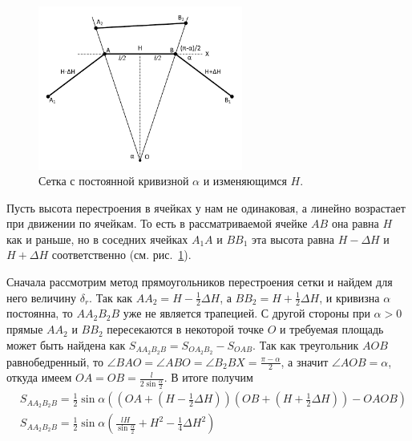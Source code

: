 \begin{figure}[h]
\onelinecaptionstrue
\centering
\includegraphics[width=0.6\textwidth]{pics/text_1_remesh_2d/theoretical_rectangles_2.pdf}
\caption{Сетка с постоянной кривизной $\alpha$ и изменяющимся $H$.}
\label{fig:text_1_remesh_2d_theoretical_rectangles_2}
\end{figure}

Пусть высота перестроения в ячейках у нам не одинаковая, а линейно возрастает при движении по ячейкам.
То есть в рассматриваемой ячейке $AB$ она равна $H$ как и раньше, но в соседних ячейках $A_1A$ и $BB_1$ эта высота равна $H - \Delta H$ и $H + \Delta H$ соответственно (см. рис.~\ref{fig:text_1_remesh_2d_theoretical_rectangles_2}).

Сначала рассмотрим метод прямоугольников перестроения сетки и найдем для него величину $\delta_r$.
Так как $AA_2 = H - \frac{1}{2} \Delta H$, а $BB_2 = H + \frac{1}{2} \Delta H$, и кривизна $\alpha$ постоянна, то $AA_2B_2B$ уже не является трапецией.
С другой стороны при $\alpha > 0$ прямые $AA_2$ и $BB_2$ пересекаются в некоторой точке $O$ и требуемая площадь может быть найдена как $S_{AA_2B_2B} = S_{OA_2B_2} - S_{OAB}$.
Так как треугольник $AOB$ равнобедренный, то $\angle BAO = \angle ABO = \angle B_2BX = \frac{\pi - \alpha}{2}$, а значит $\angle AOB = \alpha$, откуда имеем $OA = OB = \frac{l}{2 \sin \frac{\alpha}{2}}$.
В итоге получим
\begin{equation}
	\begin{aligned}
		& S_{AA_2B_2B} = \frac{1}{2} \sin \alpha \left( \left( OA + \left( H - \frac{1}{2} \Delta H \right) \right) \left( OB + \left( H + \frac{1}{2} \Delta H \right) \right) - OA OB \right) \\
		& S_{AA_2B_2B} = \frac{1}{2} \sin \alpha \left( \frac{lH}{\sin \frac{\alpha}{2}} + H^2 - \frac{1}{4}\Delta H^2 \right)
	\end{aligned}
\end{equation}

